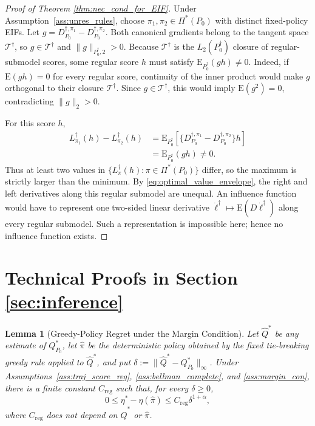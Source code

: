 \documentclass[12pt]{article}
\newtheorem{lemma}[theorem]{Lemma}
\theoremstyle{remark}\newtheorem{remark}[theorem]{Remark}\theoremstyle{plain}
\newcommand{\E}{\mathrm{E}}
\begin{document}
\begin{proof}[Proof of Theorem \ref{thm:nec_cond_for_EIF}]
    Under Assumption~\ref{ass:unres_rules}, choose
    $\pi_1,\pi_2\in\Pi^*(P_0)$ with distinct fixed-policy EIFs.
    Let
    $g=D_{P_0}^{\dagger,\pi_1}
       -D_{P_0}^{\dagger,\pi_2}$.
    Both canonical gradients belong to the tangent space
    $\mathcal T^\dagger$, so
    $g\in\mathcal T^\dagger$ and
    $\|g\|_{P_0^\dagger,2}>0$.  Because $\mathcal T^\dagger$ is
    the $L_2(P_0^\dagger)$ closure of regular-submodel scores, some
    regular score $h$ must satisfy
    $\E_{P_0^\dagger}(gh)\neq0$.  Indeed, if
    $\E(gh)=0$ for every regular score, continuity of the inner
    product would make $g$ orthogonal to their closure
    $\mathcal T^\dagger$.  Since $g\in\mathcal T^\dagger$, this would
    imply $\E(g^2)=0$, contradicting $\|g\|_2>0$.

    For this score $h$,
    \[
        \begin{aligned}
        L_{\pi_1}^\dagger(h)-L_{\pi_2}^\dagger(h)
        &=
        \E_{P_0^\dagger}\!\left[
        \{D_{P_0}^{\dagger,\pi_1}
        -D_{P_0}^{\dagger,\pi_2}\}h\right]\\
        &=\E_{P_0^\dagger}(gh)\neq0.
        \end{aligned}
    \]
    Thus at least two values in
    $\{L_\pi^\dagger(h):\pi\in\Pi^*(P_0)\}$ differ, so the maximum is
    strictly larger than the minimum.  By
    \eqref{eq:optimal_value_envelope}, the right and left derivatives
    along this regular submodel are unequal.  An influence function
    would have to represent one two-sided linear derivative
    $\dot\ell^\dagger\mapsto\E(D\dot\ell^\dagger)$ along every
    regular submodel.  Such a representation is impossible here;
    hence no influence function exists.
\end{proof}


\section{Technical Proofs in Section \ref{sec:inference}}

\begin{lemma}[Greedy-Policy Regret under the Margin Condition]
\label{lem:greedy_regret_margin}
    Let $\widehat Q^*$ be any estimate of $Q_{P_0}^*$, let
    $\widehat\pi$ be the deterministic policy obtained by the fixed
    tie-breaking greedy rule applied to $\widehat Q^*$, and put
    $\delta:=\|\widehat Q^*-Q_{P_0}^*\|_\infty$.  Under
    Assumptions~\ref{ass:traj_score_reg},
    \ref{ass:bellman_complete}, and \ref{ass:margin_con}, there is a
    finite constant
    $C_{\mathrm{reg}}$ such that, for every $\delta\geq0$,
    \[
        0\leq\eta^*-\eta(\widehat\pi)
        \leq C_{\mathrm{reg}}\delta^{1+\alpha},
    \]
    where $C_{\mathrm{reg}}$ does not depend on
    $\widehat Q^*$ or $\widehat\pi$.
\end{lemma}
\end{document}
